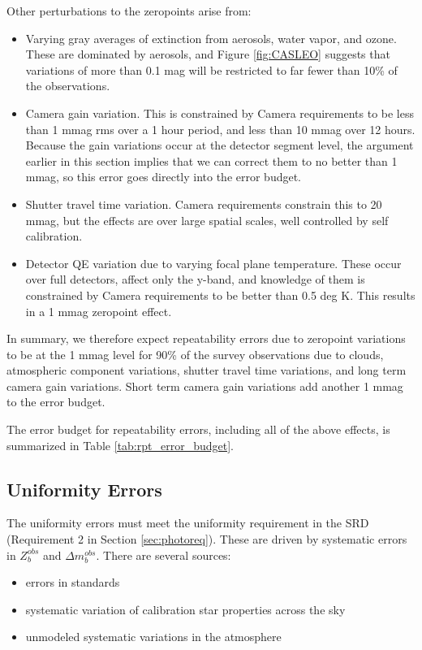 \documentclass[12pt,preprint]{aastex}
\begin{document}
Other perturbations to the zeropoints arise from:
\begin{itemize}
\item{Varying gray averages of extinction from aerosols, water vapor, and ozone.  These are dominated by aerosols, 
and Figure \ref{fig:CASLEO} suggests that variations of more than 0.1 mag will be restricted to far fewer than 
10\% of the observations.}
\item{Camera gain variation.  This is constrained by Camera requirements to be less than 1 mmag rms over a 1 hour
period, and less than 10 mmag over 12 hours.  Because the gain variations occur at the detector segment level, the
argument earlier in this section implies that we can correct them to no better than 1 mmag, so this error goes
directly into the error budget.}
\item{Shutter travel time variation.  Camera requirements constrain this to 20 mmag, but the effects are over
large spatial scales, well controlled by self calibration.}
\item{Detector QE variation due to varying focal plane temperature. These occur over full detectors,
affect only the y-band, and knowledge of them is constrained by Camera requirements to be better than 0.5 deg K.
This results in a 1 mmag zeropoint effect. }
\end{itemize}

In summary, we therefore expect repeatability errors due to zeropoint variations to be at the 1 mmag level for 90\% of the 
survey observations due to clouds, atmospheric component variations, shutter travel time variations, and long term 
camera gain variations.  Short term camera gain variations add another 1 mmag to the error budget.

The error budget for repeatability errors, including all of the above effects, is summarized in Table \ref{tab:rpt_error_budget}.
\subsection{Uniformity Errors}
The uniformity errors must meet the uniformity requirement in the SRD (Requirement 2 in Section \ref{sec:photoreq}).  These are driven by systematic errors in $Z_b^{obs}$ and $\Delta m_b^{obs}$.  There are several sources:
\begin{itemize}
\item{errors in standards}
\item{systematic variation of calibration star properties across the sky}
\item{unmodeled systematic variations in the atmosphere}
\end{itemize}
\end{document}
